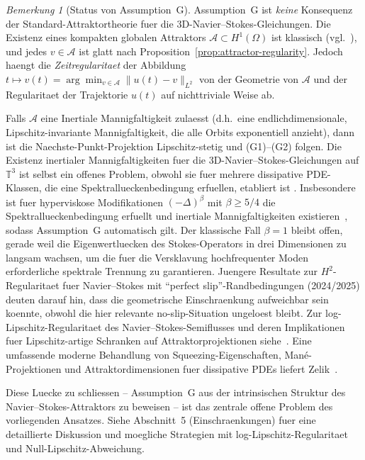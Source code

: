 \documentclass[12pt,a4paper]{article}
\theoremstyle{definition}
\theoremstyle{plain}
\theoremstyle{remark}
\newtheorem{remark}[definition]{Bemerkung}
\begin{document}
\bigskip

\begin{remark}[Status von Assumption~G]\label{rem:assumption-G}
Assumption~G ist \emph{keine} Konsequenz der Standard-Attraktortheorie fuer die
3D-Navier--Stokes-Gleichungen. Die Existenz eines kompakten globalen Attraktors
$\mathcal{A} \subset H^1(\Omega)$ ist klassisch (vgl.\
\cite{FoiasManleyRosaTemam2001,Temam2001}), und jedes $v \in \mathcal{A}$ ist glatt
nach Proposition~\ref{prop:attractor-regularity}. Jedoch haengt die \emph{Zeitregularitaet}
der Abbildung $t \mapsto v(t) = \arg\min_{v \in \mathcal{A}} \|u(t) - v\|_{L^2}$
von der Geometrie von $\mathcal{A}$ und der Regularitaet der Trajektorie $u(t)$
auf nichttriviale Weise ab.

Falls $\mathcal{A}$ eine Inertiale Mannigfaltigkeit zulaesst (d.h.\ eine endlichdimensionale,
Lipschitz-invariante Mannigfaltigkeit, die alle Orbits exponentiell anzieht), dann ist die
Naechste-Punkt-Projektion Lipschitz-stetig und (G1)--(G2) folgen.
Die Existenz inertialer Mannigfaltigkeiten fuer die 3D-Navier--Stokes-Gleichungen auf
$\mathbb{T}^3$ ist selbst ein offenes Problem, obwohl sie fuer mehrere
dissipative PDE-Klassen, die eine Spektrallueckenbedingung erfuellen, etabliert ist
\cite{EdenFoiasNicolaenko1994}. Insbesondere ist fuer hyperviskose
Modifikationen $(-\Delta)^{\beta}$ mit $\beta \geq 5/4$ die Spektrallueckenbedingung erfuellt und inertiale Mannigfaltigkeiten existieren~\cite{MalletParetSell1988},
sodass Assumption~G automatisch gilt. Der klassische Fall $\beta = 1$ bleibt
offen, gerade weil die Eigenwertluecken des Stokes-Operators in drei Dimensionen
zu langsam wachsen, um die fuer die Versklavung hochfrequenter Moden erforderliche
spektrale Trennung zu garantieren. Juengere Resultate zur $H^2$-Regularitaet fuer Navier--Stokes
mit ``perfect slip''-Randbedingungen (2024/2025) deuten darauf hin, dass die
geometrische Einschraenkung aufweichbar sein koennte, obwohl die hier relevante
no-slip-Situation ungeloest bleibt.
Zur log-Lipschitz-Regularitaet des Navier--Stokes-Semiflusses und deren
Implikationen fuer Lipschitz-artige Schranken auf Attraktorprojektionen
siehe~\cite{BarbuCannone2016,MalletParetSell1988}.
Eine umfassende moderne Behandlung von Squeezing-Eigenschaften, Man\'e-Projektionen
und Attraktordimensionen fuer dissipative PDEs liefert
Zelik~\cite{Zelik2022}.

Diese Luecke zu schliessen -- Assumption~G aus der intrinsischen Struktur des
Navier--Stokes-Attraktors zu beweisen -- ist das zentrale offene Problem des vorliegenden Ansatzes.
Siehe Abschnitt~5 (Einschraenkungen) fuer eine detaillierte Diskussion und moegliche Strategien
mit log-Lipschitz-Regularitaet und Null-Lipschitz-Abweichung.


\end{remark}
\end{document}
